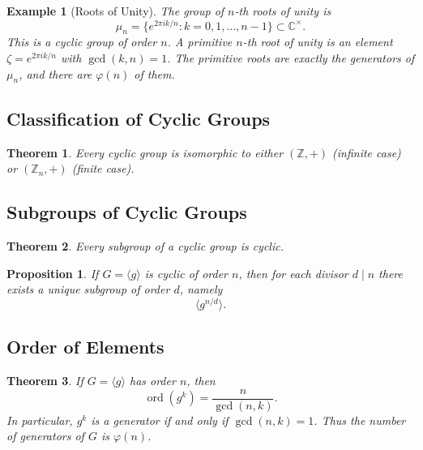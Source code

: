 \documentclass[12pt]{article}
\newtheorem{proposition}{Proposition}
\newtheorem{theorem}{Theorem}
\newtheorem{example}{Example}
\begin{document}
	\begin{example}[Roots of Unity]
		The group of $n$-th roots of unity is
		$$
		\mu_n = \{ e^{2\pi i k / n} : k = 0,1,\dots,n-1 \} \subset \mathbb{C}^\times.
		$$
		This is a cyclic group of order $n$. A primitive $n$-th root of unity is an element $\zeta = e^{2\pi i k / n}$ with $\gcd(k,n)=1$. 
		The primitive roots are exactly the generators of $\mu_n$, and there are $\varphi(n)$ of them.
	\end{example}
	
	\subsection*{Classification of Cyclic Groups}
	
	\begin{theorem}
		Every cyclic group is isomorphic to either $(\mathbb{Z},+)$ (infinite case) or $(\mathbb{Z}_n,+)$ (finite case).
	\end{theorem}
	
	\subsection*{Subgroups of Cyclic Groups}
	
	\begin{theorem}
		Every subgroup of a cyclic group is cyclic.
	\end{theorem}
	
	\begin{proposition}
		If $G = \langle g \rangle$ is cyclic of order $n$, then for each divisor $d \mid n$ there exists a unique subgroup of order $d$, namely
		$$
		\langle g^{n/d} \rangle.
		$$
	\end{proposition}
	
	\subsection*{Order of Elements}
	
	\begin{theorem}
		If $G = \langle g \rangle$ has order $n$, then
		$$
		\operatorname{ord}(g^k) = \frac{n}{\gcd(n,k)}.
		$$
		In particular, $g^k$ is a generator if and only if $\gcd(n,k)=1$. 
		Thus the number of generators of $G$ is $\varphi(n)$.
	\end{theorem}
	
\end{document}
